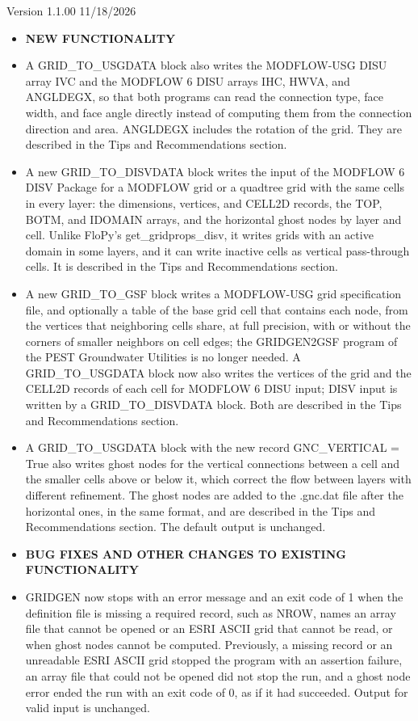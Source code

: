 \item Version 1.1.00 11/18/2026
\begin{itemize}[label=--]
  \item[] \textbf{NEW FUNCTIONALITY}
  \item A GRID\_TO\_USGDATA block also writes the MODFLOW-USG DISU array IVC and the MODFLOW 6 DISU arrays IHC, HWVA, and ANGLDEGX, so that both programs can read the connection type, face width, and face angle directly instead of computing them from the connection direction and area. ANGLDEGX includes the rotation of the grid. They are described in the Tips and Recommendations section.
  \item A new GRID\_TO\_DISVDATA block writes the input of the MODFLOW 6 DISV Package for a MODFLOW grid or a quadtree grid with the same cells in every layer: the dimensions, vertices, and CELL2D records, the TOP, BOTM, and IDOMAIN arrays, and the horizontal ghost nodes by layer and cell. Unlike FloPy's get\_gridprops\_disv, it writes grids with an active domain in some layers, and it can write inactive cells as vertical pass-through cells. It is described in the Tips and Recommendations section.
  \item A new GRID\_TO\_GSF block writes a MODFLOW-USG grid specification file, and optionally a table of the base grid cell that contains each node, from the vertices that neighboring cells share, at full precision, with or without the corners of smaller neighbors on cell edges; the GRIDGEN2GSF program of the PEST Groundwater Utilities is no longer needed. A GRID\_TO\_USGDATA block now also writes the vertices of the grid and the CELL2D records of each cell for MODFLOW 6 DISU input; DISV input is written by a GRID\_TO\_DISVDATA block. Both are described in the Tips and Recommendations section.
  \item A GRID\_TO\_USGDATA block with the new record GNC\_VERTICAL = True also writes ghost nodes for the vertical connections between a cell and the smaller cells above or below it, which correct the flow between layers with different refinement. The ghost nodes are added to the .gnc.dat file after the horizontal ones, in the same format, and are described in the Tips and Recommendations section. The default output is unchanged.
  \item[] \textbf{BUG FIXES AND OTHER CHANGES TO EXISTING FUNCTIONALITY}
  \item GRIDGEN now stops with an error message and an exit code of 1 when the definition file is missing a required record, such as NROW, names an array file that cannot be opened or an ESRI ASCII grid that cannot be read, or when ghost nodes cannot be computed. Previously, a missing record or an unreadable ESRI ASCII grid stopped the program with an assertion failure, an array file that could not be opened did not stop the run, and a ghost node error ended the run with an exit code of 0, as if it had succeeded. Output for valid input is unchanged.

\end{itemize}
